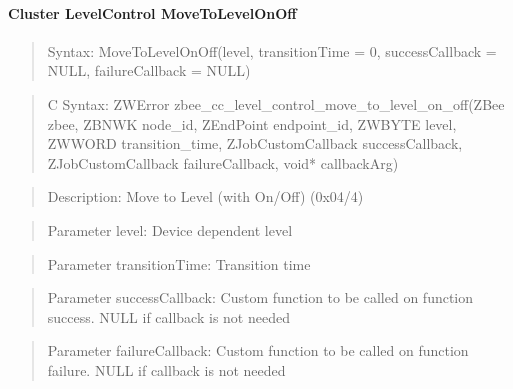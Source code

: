 \paragraph{Cluster LevelControl MoveToLevelOnOff}
\begin{quote}Syntax: MoveToLevelOnOff(level, transitionTime = 0, successCallback = NULL, failureCallback = NULL)\end{quote}
\begin{quote}C Syntax: ZWError zbee\_cc\_level\_control\_move\_to\_level\_on\_off(ZBee zbee, ZBNWK node\_id, ZEndPoint endpoint\_id, ZWBYTE level, ZWWORD transition\_time, ZJobCustomCallback successCallback, ZJobCustomCallback failureCallback, void* callbackArg)\end{quote}
\begin{quote}Description: Move to Level (with On/Off) (0x04/4)\end{quote}
\begin{quote}Parameter level: Device dependent level\end{quote}
\begin{quote}Parameter transitionTime: Transition time\end{quote}
\begin{quote}Parameter successCallback: Custom function to be called on function success. NULL if callback is not needed\end{quote}
\begin{quote}Parameter failureCallback: Custom function to be called on function failure. NULL if callback is not needed\end{quote}


